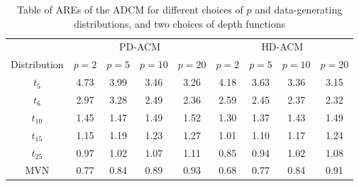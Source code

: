 \begin{table}[t]
\begin{footnotesize}
\centering
    \begin{tabular}{c|cccc|cccc}
    \hline
    & \multicolumn{4}{c|}{PD-ACM} & \multicolumn{4}{c}{HD-ACM} \\\cline{2-9}
    Distribution & $p=2$  & $p=5$  & $p=10$ & $p=20$ & $p=2$  & $p=5$  & $p=10$ & $p=20$ \\ \hline
    $t_5$           & 4.73 & 3.99 & 3.46 & 3.26 & 4.18 & 3.63 & 3.36 & 3.15 \\
    $t_6$           & 2.97 & 3.28 & 2.49 & 2.36 & 2.59 & 2.45 & 2.37 & 2.32 \\
    $t_{10}$          & 1.45 & 1.47 & 1.49 & 1.52 & 1.30 & 1.37 & 1.43 & 1.49 \\
    $t_{15}$          & 1.15 & 1.19 & 1.23 & 1.27 & 1.01 & 1.10 & 1.17 & 1.24 \\
    $t_{25}$          & 0.97 & 1.02 & 1.07 & 1.11 & 0.85 & 0.94 & 1.02 & 1.08 \\
    MVN          & 0.77 & 0.84 & 0.89 & 0.93 & 0.68 & 0.77 & 0.84 & 0.91 \\ \hline
    \end{tabular}
    \caption{Table of AREs of the ADCM for different choices of $p$ and data-generating distributions, and two choices of depth functions}
    \label{table:AREtable}
\end{footnotesize}
\end{table}

